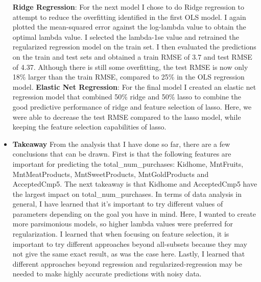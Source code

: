 \documentclass[11pt]{article} %
\begin{document}
\begin{itemize}
\newline
\textbf{Ridge Regression}: For the next model I chose to do Ridge regression to attempt to reduce the overfitting identified in the first OLS model. I again plotted the mean-squared error against the log-lambda value to obtain the optimal lambda value. I selected the lambda-1se value and retrained the regularized regression model on the train set. I then evaluated the predictions on the train and test sets and obtained a train RMSE of 3.7 and test RMSE of 4.37. Although there is still some overfitting, the test RMSE is now only 18\% larger than the train RMSE, compared to 25\% in the OLS regression model. 
\newline
\textbf{Elastic Net Regression}: For the final model I created an elastic net regression model that combined 50\% ridge and 50\% lasso to combine the good predictive performance of ridge and feature selection of lasso. Here, we were able to decrease the test RMSE compared to the lasso model, while keeping the feature selection capabilities of lasso. 
\item \textbf{Takeaway}
\newline
From the analysis that I have done so far, there are a few conclusions that can be drawn. First is that the following features are important for predicting the total\_num\_purchases: Kidhome, MntFruits, MntMeatProducts, MntSweetProducts, MntGoldProducts and AcceptedCmp5. The next takeaway is that Kidhome and AcceptedCmp5 have the largest impact on total\_num\_purchases. In terms of data analysis in general, I have learned that it’s important to try different values of parameters depending on the goal you have in mind. Here, I wanted to create more parsimonious models, so higher lambda values were preferred for regularization. I learned that when focusing on feature selection, it is important to try different approaches beyond all-subsets because they may not give the same exact result, as was the case here. Lastly, I learned that different approaches beyond regression and regularized-regression may be needed to make highly accurate predictions with noisy data.
\end{itemize}

\end{document}
